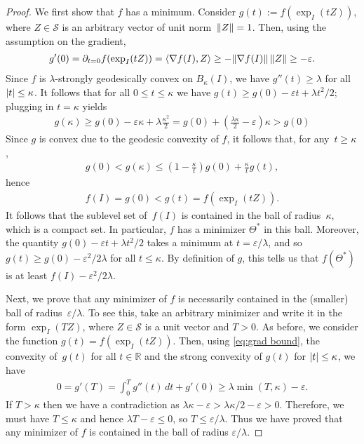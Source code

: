 \documentclass{article}
\DeclarePairedDelimiter{\abs}{\lvert}{\rvert}
\DeclarePairedDelimiter{\norm}{\lVert}{\rVert}
\newcommand{\R}{{\mathbb{R}}}
\newcommand\eps{\varepsilon}
\newcommand\Sym{\mathcal{S}}
\begin{document}
\begin{proof}
We first show that $f$ has a minimum.
Consider $g(t) := f(\exp_I(tZ))$, where $Z\in \Sym$ is an arbitrary vector of unit norm~$\norm Z = 1$.
Then, using the assumption on the gradient,
\begin{align}\label{eq:grad bound}
  g'(0)
= \partial_{t=0} f(\exp_{I}(tZ))
= \braket{\nabla f(I), Z}
\geq -\norm{\nabla f(I)} \, \norm Z
\geq -\eps.
\end{align}
Since $f$ is $\lambda$-strongly geodesically convex on $B_\kappa(I)$, we have $g''(t) \geq \lambda$ for all $\abs t\leq\kappa$. It follows that 
for all $0 \leq t \leq \kappa$ we have $g(t) \geq g(0) - \eps t + \lambda t^2/2$; plugging in $t = \kappa$ yields 
\begin{align*}
  g(\kappa)
\geq g(0) - \eps \kappa + \lambda \frac{\kappa^2}2
= g(0) + \left( \frac{\lambda\kappa}2 - \eps \right) \kappa
> g(0)
\end{align*}
Since $g$ is convex due to the geodesic convexity of $f$, it follows that, for any~$t \geq \kappa$,
\begin{align*}
  g(0) < g(\kappa) \leq \left( 1-\frac{\kappa}t \right) g(0) + \frac{\kappa}t g(t),
\end{align*}
hence
\begin{align*}
  f(I) = g(0) < g(t) = f(\exp_{I}(tZ)).
\end{align*}
It follows that the sublevel set of~$f(I)$ is contained in the ball of radius~$\kappa$, which is a compact set.
In particular, $f$ has a minimizer $\Theta^*$ in this ball. Moreover, the quantity $ g(0) - \eps t + \lambda t^2/2$ takes a minimum at $t = \eps/ \lambda$, and so $g(t) \geq g(0) - \eps^2/2\lambda$ for all $t \leq \kappa$. By definition of $g$, this tells us that $f(\Theta^*)$ is at least $f(I) - \eps^2/2\lambda$.

Next, we prove that any minimizer of $f$ is necessarily contained in the (smaller) ball of radius~$\eps/\lambda$.
To see this, take an arbitrary minimizer and write it in the form $\exp_I(TZ)$, where $Z\in \Sym$ is a unit vector and $T>0$.
As before, we consider the function $g(t) = f(\exp_I(tZ))$.
Then, using \cref{eq:grad bound}, the convexity of~$g(t)$ for all $t\in\R$ and the strong convexity of $g(t)$ for $\abs t \leq \kappa$, we have
\begin{align*}
  0 = g'(T) = \int_0^T g''(t) \, dt + g'(0) \geq \lambda \min(T, \kappa) - \eps.
\end{align*}
If $T>\kappa$ then we have a contradiction as $\lambda\kappa - \eps > \lambda\kappa/2 - \eps > 0$.
Therefore, we must have $T\leq\kappa$ and hence $\lambda T - \eps \leq 0$, so $T \leq \eps/\lambda$.
Thus we have proved that any minimizer of $f$ is contained in the ball of radius $\eps/\lambda$.


\end{proof}
\end{document}
